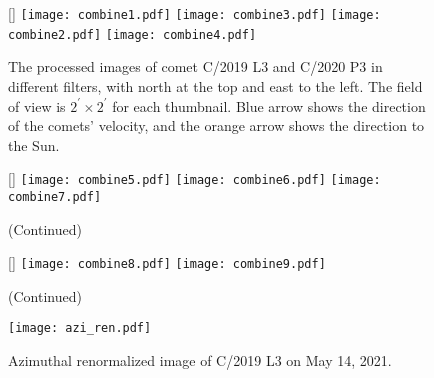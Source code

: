 \begin{figure}
    \centering
    [\linewidth]{
        \texttt{[image: combine1.pdf]}
        \texttt{[image: combine3.pdf]} 
        \texttt{[image: combine2.pdf]}
        \texttt{[image: combine4.pdf]}
    }
    \caption{The processed images of comet C/2019 L3 and C/2020 P3 in different filters, with north at the top and east to the left. The field of view is $ 2^{\prime} \times 2^{\prime} $ for each thumbnail. Blue arrow shows the direction of the comets' velocity, and the orange arrow shows the direction to the Sun. }
    \label{fig:combinedimg}
\end{figure}

\begin{figure}
    \centering
    \ContinuedFloat
    [\linewidth]{
        \texttt{[image: combine5.pdf]}
        \texttt{[image: combine6.pdf]} 
        \texttt{[image: combine7.pdf]} 
    }
        
    \caption{(Continued)}
\end{figure}

\begin{figure}
    \centering
    \ContinuedFloat
    [\linewidth]{
        \texttt{[image: combine8.pdf]}
        \texttt{[image: combine9.pdf]} 
    }
    
    \caption{(Continued)}
\end{figure}

\begin{figure}
    \centering
    \texttt{[image: azi\_ren.pdf]}
    \caption{Azimuthal renormalized image of C/2019 L3 on May 14, 2021. \label{fig:aziren}}
\end{figure}
    
